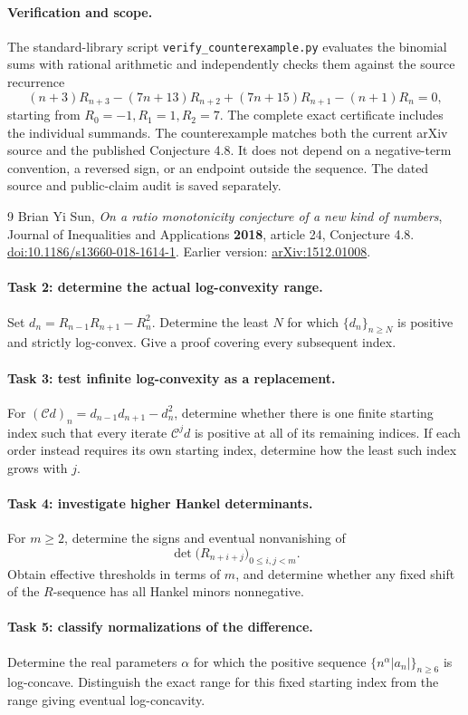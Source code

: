 \documentclass[11pt]{article}
\begin{document}
\paragraph{Verification and scope.}
The standard-library script \texttt{verify\_counterexample.py} evaluates
the binomial sums with rational arithmetic and independently checks
them against the source recurrence
\[
 (n+3)R_{n+3}-(7n+13)R_{n+2}+(7n+15)R_{n+1}-(n+1)R_n=0,
\]
starting from \(R_0=-1,R_1=1,R_2=7\).
The complete exact certificate includes the individual summands.
The counterexample matches both the current arXiv source and
the published Conjecture 4.8. It does not depend on a negative-term
convention, a reversed sign, or an endpoint outside the sequence.
The dated source and public-claim audit is saved separately.

\begin{thebibliography}{9}
 Brian Yi Sun,
\emph{On a ratio monotonicity conjecture of a new kind of numbers},
Journal of Inequalities and Applications \textbf{2018}, article 24,
Conjecture 4.8.
\href{https://doi.org/10.1186/s13660-018-1614-1}{doi:10.1186/s13660-018-1614-1}.
Earlier version: \href{https://arxiv.org/abs/1512.01008}{arXiv:1512.01008}.
\end{thebibliography}

\newpage
\paragraph{Task 2: determine the actual log-convexity range.}
Set \(d_n=R_{n-1}R_{n+1}-R_n^2\).
Determine the least \(N\) for which \(\{d_n\}_{n\ge N}\) is positive
and strictly log-convex. Give a proof covering every subsequent index.

\paragraph{Task 3: test infinite log-convexity as a replacement.}
For \((\mathcal C d)_n=d_{n-1}d_{n+1}-d_n^2\), determine whether
there is one finite starting index such that every iterate
\(\mathcal C^j d\) is positive at all of its remaining indices.
If each order instead requires its own starting index, determine
how the least such index grows with \(j\).

\paragraph{Task 4: investigate higher Hankel determinants.}
For \(m\ge2\), determine the signs and eventual nonvanishing of
\[
 \det\bigl(R_{n+i+j}\bigr)_{0\le i,j<m}.
\]
Obtain effective thresholds in terms of \(m\), and determine whether
any fixed shift of the \(R\)-sequence has all Hankel minors nonnegative.

\paragraph{Task 5: classify normalizations of the difference.}
Determine the real parameters \(\alpha\) for which the positive
sequence \(\{n^\alpha|a_n|\}_{n\ge6}\) is log-concave.
Distinguish the exact range for this fixed starting index from the
range giving eventual log-concavity.
\end{document}
